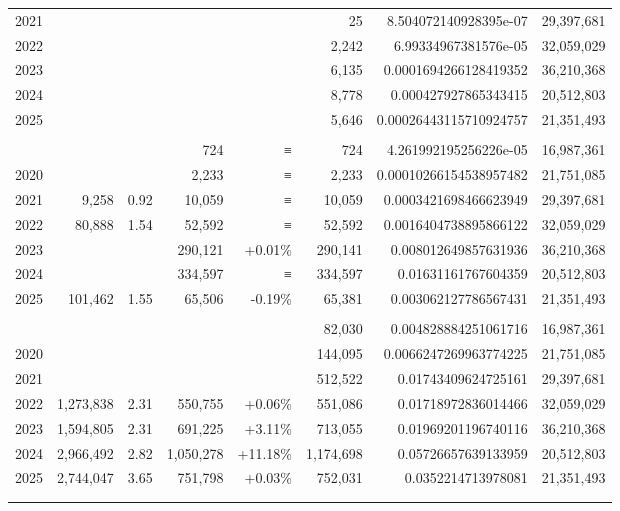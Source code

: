 \begin{table}[!t]
\begin{tabular*}{\linewidth}{@{\extracolsep{\fill}}l|rrrrrrr}
2021 &  &  &  &  & 25 & 8.504072140928395e-07 & 29,397,681 \\
2022 &  &  &  &  & 2,242 & 6.99334967381576e-05 & 32,059,029 \\
2023 &  &  &  &  & 6,135 & 0.0001694266128419352 & 36,210,368 \\
2024 &  &  &  &  & 8,778 & 0.000427927865343415 & 20,512,803 \\
2025 &  &  &  &  & 5,646 & 0.00026443115710924757 & 21,351,493 \\
\midrule\addlinespace[2.5pt]
\multicolumn{8}{l}{Reddit} \\[2.5pt] 
\midrule\addlinespace[2.5pt]
2019 &  &  & 724 & ≡ & 724 & 4.261992195256226e-05 & 16,987,361 \\
2020 &  &  & 2,233 & ≡ & 2,233 & 0.00010266154538957482 & 21,751,085 \\
2021 & 9,258 & 0.92 & 10,059 & ≡ & 10,059 & 0.0003421698466623949 & 29,397,681 \\
2022 & 80,888 & 1.54 & 52,592 & ≡ & 52,592 & 0.0016404738895866122 & 32,059,029 \\
2023 &  &  & 290,121 & +0.01\% & 290,141 & 0.008012649857631936 & 36,210,368 \\
2024 &  &  & 334,597 & ≡ & 334,597 & 0.01631161767604359 & 20,512,803 \\
2025 & 101,462 & 1.55 & 65,506 & -0.19\% & 65,381 & 0.003062127786567431 & 21,351,493 \\
\midrule\addlinespace[2.5pt]
\multicolumn{8}{l}{Snap} \\[2.5pt] 
\midrule\addlinespace[2.5pt]
2019 &  &  &  &  & 82,030 & 0.004828884251061716 & 16,987,361 \\
2020 &  &  &  &  & 144,095 & 0.0066247269963774225 & 21,751,085 \\
2021 &  &  &  &  & 512,522 & 0.01743409624725161 & 29,397,681 \\
2022 & 1,273,838 & 2.31 & 550,755 & +0.06\% & 551,086 & 0.01718972836014466 & 32,059,029 \\
2023 & 1,594,805 & 2.31 & 691,225 & +3.11\% & 713,055 & 0.01969201196740116 & 36,210,368 \\
2024 & 2,966,492 & 2.82 & 1,050,278 & +11.18\% & 1,174,698 & 0.05726657639133959 & 20,512,803 \\
2025 & 2,744,047 & 3.65 & 751,798 & +0.03\% & 752,031 & 0.0352214713978081 & 21,351,493 \\
\midrule\addlinespace[2.5pt]
\multicolumn{8}{l}{TikTok} \\[2.5pt] 
\midrule\addlinespace[2.5pt]

\end{tabular*}
\end{table}

